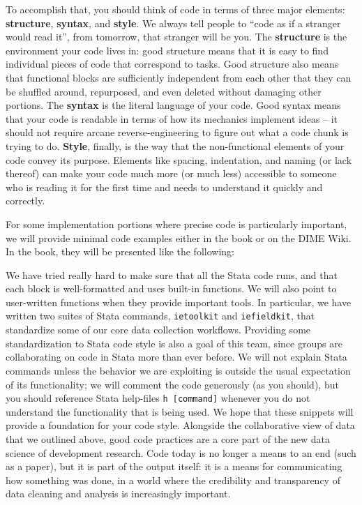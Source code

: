 To accomplish that, you should think of code in terms of three major elements:
\textbf{structure}, \textbf{syntax}, and \textbf{style}.
We always tell people to ``code as if a stranger would read it'',
from tomorrow, that stranger will be you.
The \textbf{structure} is the environment your code lives in:
good structure means that it is easy to find individual pieces of code that correspond to tasks.
Good structure also means that functional blocks are sufficiently independent from each other
that they can be shuffled around, repurposed, and even deleted without damaging other portions.
The \textbf{syntax} is the literal language of your code.
Good syntax means that your code is readable
in terms of how its mechanics implement ideas --
it should not require arcane reverse-engineering
to figure out what a code chunk is trying to do.
\textbf{Style}, finally, is the way that the non-functional elements of your code convey its purpose.
Elements like spacing, indentation, and naming (or lack thereof) can make your code much more 
(or much less) accessible to someone who is reading it for the first time and needs to understand it quickly and correctly.

For some implementation portions where precise code is particularly important,
we will provide minimal code examples either in the book or on the DIME Wiki.
In the book, they will be presented like the following:


We have tried really hard to make sure that all the Stata code runs,
and that each block is well-formatted and uses built-in functions.
We will also point to user-written functions when they provide important tools.
In particular, we have written two suites of Stata commands,
\texttt{ietoolkit} and \texttt{iefieldkit},
that standardize some of our core data collection workflows.
Providing some standardization to Stata code style is also a goal of this team,
since groups are collaborating on code in Stata more than ever before.
We will not explain Stata commands unless the behavior we are exploiting
is outside the usual expectation of its functionality;
we will comment the code generously (as you should),
but you should reference Stata help-files \texttt{h [command]}
whenever you do not understand the functionality that is being used.
We hope that these snippets will provide a foundation for your code style.
Alongside the collaborative view of data that we outlined above,
good code practices are a core part of the new data science of development research.
Code today is no longer a means to an end (such as a paper),
but it is part of the output itself: it is a means for communicating how something was done,
in a world where the credibility and transparency of data cleaning and analysis is increasingly important.

